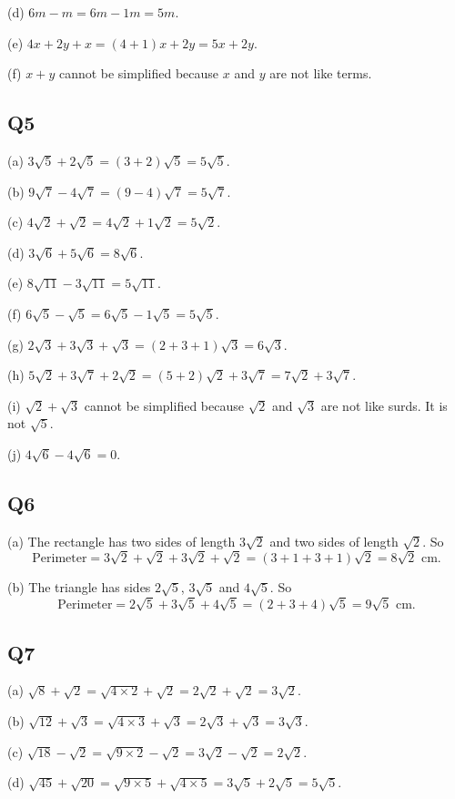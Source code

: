 \documentclass[12pt,a4paper]{article}
\begin{document}
(d) $6m-m = 6m-1m = 5m$.

(e) $4x+2y+x = (4+1)x+2y = 5x+2y$.

(f) $x+y$ cannot be simplified because $x$ and $y$ are not like terms.

\subsection*{Q5}
(a) $3\sqrt5+2\sqrt5 = (3+2)\sqrt5 = 5\sqrt5$.

(b) $9\sqrt7-4\sqrt7 = (9-4)\sqrt7 = 5\sqrt7$.

(c) $4\sqrt2+\sqrt2 = 4\sqrt2+1\sqrt2 = 5\sqrt2$.

(d) $3\sqrt6+5\sqrt6 = 8\sqrt6$.

(e) $8\sqrt{11}-3\sqrt{11} = 5\sqrt{11}$.

(f) $6\sqrt5-\sqrt5 = 6\sqrt5-1\sqrt5 = 5\sqrt5$.

(g) $2\sqrt3+3\sqrt3+\sqrt3 = (2+3+1)\sqrt3 = 6\sqrt3$.

(h) $5\sqrt2+3\sqrt7+2\sqrt2 = (5+2)\sqrt2+3\sqrt7 = 7\sqrt2+3\sqrt7$.

(i) $\sqrt2+\sqrt3$ cannot be simplified because $\sqrt2$ and $\sqrt3$ are not like surds. It is not $\sqrt5$.

(j) $4\sqrt6-4\sqrt6 = 0$.

\subsection*{Q6}
(a) The rectangle has two sides of length $3\sqrt2$ and two sides of length $\sqrt2$. So
\[
\text{Perimeter} = 3\sqrt2+\sqrt2+3\sqrt2+\sqrt2 = (3+1+3+1)\sqrt2 = 8\sqrt2 \text{ cm}.
\]

(b) The triangle has sides $2\sqrt5$, $3\sqrt5$ and $4\sqrt5$. So
\[
\text{Perimeter} = 2\sqrt5+3\sqrt5+4\sqrt5 = (2+3+4)\sqrt5 = 9\sqrt5 \text{ cm}.
\]

\subsection*{Q7}
(a) $\sqrt8+\sqrt2 = \sqrt{4\times2}+\sqrt2 = 2\sqrt2+\sqrt2 = 3\sqrt2$.

(b) $\sqrt{12}+\sqrt3 = \sqrt{4\times3}+\sqrt3 = 2\sqrt3+\sqrt3 = 3\sqrt3$.

(c) $\sqrt{18}-\sqrt2 = \sqrt{9\times2}-\sqrt2 = 3\sqrt2-\sqrt2 = 2\sqrt2$.

(d) $\sqrt{45}+\sqrt{20} = \sqrt{9\times5}+\sqrt{4\times5} = 3\sqrt5+2\sqrt5 = 5\sqrt5$.
\end{document}
